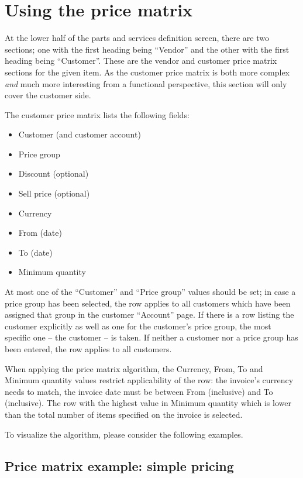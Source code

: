 \section{Using the price matrix}

At the lower half of the parts and services definition screen, there are two sections; one with the first
heading being ``Vendor'' and the other with the first heading being ``Customer''.  These are the vendor and
customer price matrix sections for the given item. As the customer price matrix is both more complex 
\textit{and} much more interesting from a functional perspective, this section will only cover the customer
side.

The customer price matrix lists the following fields:

\begin{itemize}
	\item Customer (and customer account)
	\item Price group
	\item Discount (optional)
	\item Sell price (optional)
	\item Currency
	\item From (date)
	\item To (date)
	\item Minimum quantity
\end{itemize}

At most one of the ``Customer'' and ``Price group'' values should be set; in case a price group has been selected,
the row applies to all customers which have been assigned that group in the customer ``Account'' page. If there
is a row listing the customer explicitly as well as one for the customer's price group, the most specific one --
the customer -- is taken. If neither a customer nor a price group has been entered, the row applies to all customers.

When applying the price matrix algorithm, the Currency, From, To and Minimum quantity values restrict applicability
of the row: the invoice's currency needs to match, the invoice date must be between From (inclusive) and To (inclusive).
The row with the highest value in Minimum quantity which is lower than the total number of items specified on the invoice
is selected.

To visualize the algorithm, please consider the following examples.

\subsection{Price matrix example: simple pricing}


